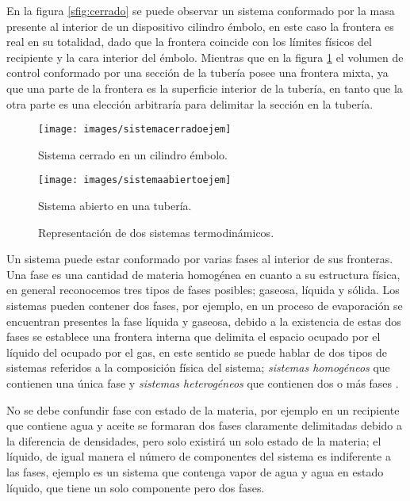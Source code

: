 \documentclass[../master.tex]{subfiles}
\begin{document}
En la figura \ref{sfig:cerrado} se puede observar un sistema conformado por la masa presente al interior de un dispositivo cilindro émbolo, en este caso la frontera es real en su totalidad, dado que la frontera coincide con los límites físicos del recipiente y la cara interior del émbolo. Mientras que en la figura \ref{sfig:abierto} el volumen de control conformado por una sección de la tubería posee una frontera mixta, ya que una parte de la frontera es la superficie interior de la tubería, en tanto que la otra parte es una elección arbitraría para delimitar la sección en la tubería.

\begin{figure}[htbp]
    \centering
    \begin{subcaptionblock}{0.4\linewidth}
        \centering
        \texttt{[image: images/sistemacerradoejem]}
        \caption{Sistema cerrado en un cilindro émbolo.}
        \label{sfig:cerrado}
    \end{subcaptionblock}
    \begin{subcaptionblock}{0.4\linewidth}
        \centering
        \texttt{[image: images/sistemaabiertoejem]}
        \caption{Sistema abierto en una tubería.}
        \label{sfig:abierto}
    \end{subcaptionblock}
    \caption{Representación de dos sistemas termodinámicos.}
\end{figure}

Un sistema puede estar conformado por varias fases al interior de sus fronteras. Una fase es una cantidad de materia homogénea en cuanto a su estructura física, en general reconocemos tres tipos de fases posibles; gaseosa, líquida y sólida. Los sistemas pueden contener dos fases, por ejemplo, en un proceso de evaporación se encuentran presentes la fase líquida y gaseosa, debido a la existencia de estas dos fases se establece una frontera interna que delimita el espacio ocupado por el líquido del ocupado por el gas, en este sentido se puede hablar de dos tipos de sistemas referidos a la composición física del sistema; \emph{sistemas homogéneos} que contienen una única fase y \emph{sistemas heterogéneos} que contienen dos o más fases \parencites{wark}{glasstone}.

No se debe confundir fase con estado de la materia, por ejemplo en un recipiente que contiene agua y aceite se formaran dos fases claramente delimitadas debido a la diferencia de densidades, pero solo existirá un solo estado de la materia; el líquido, de igual manera el número de componentes del sistema es indiferente a las fases, ejemplo es un sistema que contenga vapor de agua y agua en estado líquido, que tiene un solo componente pero dos fases.
\end{document}
